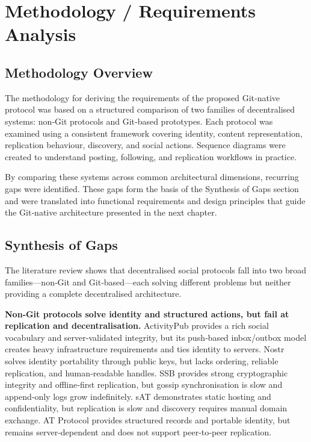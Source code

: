 \section{Methodology / Requirements Analysis}\label{sec:methodology}


\subsection{Methodology Overview}

The methodology for deriving the requirements of the proposed Git‑native protocol was based on a structured comparison of two families of decentralised systems: non‑Git protocols and Git‑based prototypes. Each protocol was examined using a consistent framework covering identity, content representation, replication behaviour, discovery, and social actions. Sequence diagrams were created to understand posting, following, and replication workflows in practice.

By comparing these systems across common architectural dimensions, recurring gaps were identified. These gaps form the basis of the Synthesis of Gaps section and were translated into functional requirements and design principles that guide the Git‑native architecture presented in the next chapter.


\subsection*{Synthesis of Gaps}

The literature review shows that decentralised social protocols fall into two broad families—non‑Git
and Git‑based—each solving different problems but neither providing a complete decentralised
architecture.

\textbf{Non‑Git protocols solve identity and structured actions, but fail at replication and
decentralisation.}
ActivityPub provides a rich social vocabulary and server‑validated integrity, but its push‑based
inbox/outbox model creates heavy infrastructure requirements and ties identity to servers. Nostr
solves identity portability through public keys, but lacks ordering, reliable replication, and
human‑readable handles. SSB provides strong cryptographic integrity and offline‑first replication, but
gossip synchronisation is slow and append‑only logs grow indefinitely. sAT demonstrates static
hosting and confidentiality, but replication is slow and discovery requires manual domain exchange.
AT Protocol provides structured records and portable identity, but remains server‑dependent and
does not support peer‑to‑peer replication.

